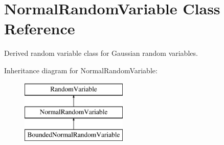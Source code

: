 \section{Normal\+Random\+Variable Class Reference}
\label{classPecos_1_1NormalRandomVariable}


Derived random variable class for Gaussian random variables.  


Inheritance diagram for Normal\+Random\+Variable\+:\begin{figure}[H]
\begin{center}
\leavevmode
\includegraphics[height=3.000000cm]{classPecos_1_1NormalRandomVariable}
\end{center}
\end{figure}
